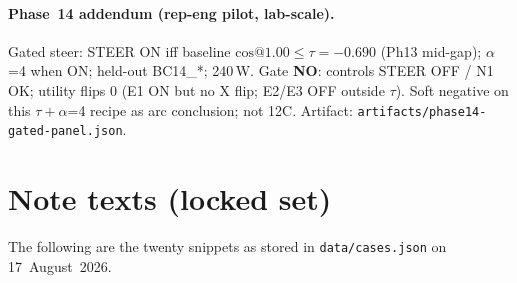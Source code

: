 \documentclass[11pt,a4paper]{article}
\begin{document}
\paragraph{Phase~14 addendum (rep-eng pilot, lab-scale).}
Gated steer: STEER ON iff baseline $\mathrm{cos}@1.00 \leq \tau{=}{-}0.690$ (Ph13 mid-gap); $\alpha$=4 when ON; held-out BC14\_*; 240\,W.
Gate \textbf{NO}: controls STEER OFF / N1 OK; utility flips 0 (E1 ON but no X flip; E2/E3 OFF outside $\tau$).
Soft negative on this $\tau{+}\alpha$=4 recipe as arc conclusion; not 12C. Artifact: \texttt{artifacts/phase14-gated-panel.json}.

\appendix
\section{Note texts (locked set)}

The following are the twenty snippets as stored in \texttt{data/cases.json} on 17~August~2026.
\end{document}
